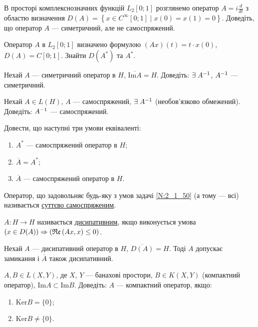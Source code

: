 \begin{exercise}
    В просторі комплекснозначних функцій $L_2[0;1]$ розглянемо оператор $A = i \frac{d}{dt}$
    з областю визначення
    $D(A) = \left\{
        x \in C^\infty[0;1] \mid x(0) = x(1) = 0
    \right\}.$
    Доведіть, що оператор $A$ --- симетричний, але не самоспряжений.
\end{exercise}

\begin{exercise}
    Оператор $A$ в $L_2[0;1]$ визначено формулою $(Ax)(t) = t \cdot x(0)$, $D(A) = C[0;1]$.
    Знайти $D(A^*)$ та $A^*$.
\end{exercise}

\begin{exercise}
    Нехай $A$ --- симетричний оператор в $H$, $\overline{\mathrm{Im}A} = H$.
    Доведіть: $\exists \; A^{-1}$, $A^{-1}$ --- симетричний.
\end{exercise}

\begin{exercise}
    Нехай $A \in L(H)$, $A$ --- самоспряжений, $\exists \; A^{-1}$ (необов'язково обмежений).
    Доведіть: $A^{-1}$ --- самоспряжений.
\end{exercise}

\begin{exercise}\label{N:2_1_50}
    Довести, що наступні три умови еквіваленті:
    \begin{enumerate}
        \item $A^*$ --- самоспряжений оператор в $H$;
        \item $\overline{A} = A^*$;
        \item $\overline{A}$ --- самоспряжений оператор в $H$.
    \end{enumerate}
\end{exercise}

\begin{theory}
    Оператор, що задовольняє будь-яку з умов задачі \ref{N:2_1_50} (а тому --- всі) називається
    \ul{суттєво самоспряженим}.

     $A: H \to H$ називається \ul{дисипативним}, якщо виконується умова
    $(x \in D(A)) \Rightarrow (\mathfrak{Re}\left(Ax, x\right) \leq 0)$.
\end{theory}

\begin{exercise}
    Нехай $A$ --- дисипативний оператор в $H$, $\overline{D(A)} = H$.
    Тоді $A$ допускає замикання і $\overline{A}$ також дисипативний.
\end{exercise}

\begin{exercise}
    $A,B \in L(X,Y)$, де $X$, $Y$ --- банахові простори, $B \in K(X,Y)$ (компактний оператор),
    $\mathrm{Im} A \subset \mathrm{Im} B$. Доведіть: $A$ --- компактний оператор, якщо:
    \begin{enumerate}
        \item $\mathrm{Ker} B = \{0\}$;
        \item $\mathrm{Ker} B \neq \{0\} $.
    \end{enumerate}    
\end{exercise}
